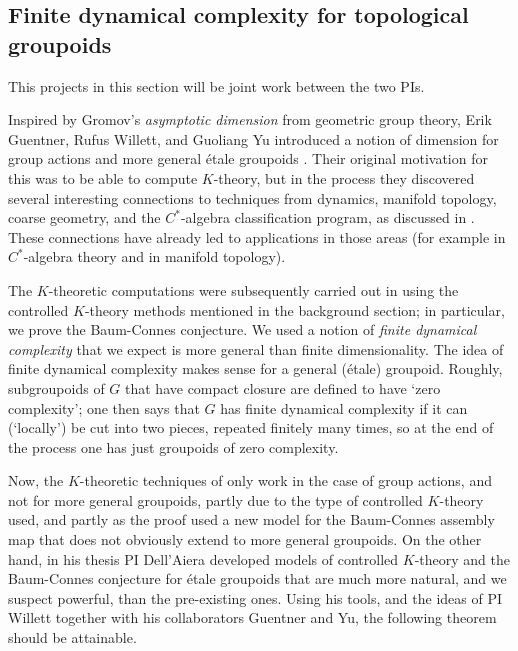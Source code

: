  
 
 
\subsection{Finite dynamical complexity for topological groupoids}

This projects in this section will be joint work between the two PIs.

Inspired by Gromov's \emph{asymptotic dimension} \cite[Section 1.E]{Gromov:1993tr} from geometric group theory, Erik Guentner, Rufus Willett, and Guoliang Yu introduced a notion of dimension for group actions and more general \'{e}tale groupoids \cite{Guentner:2014aa}.  Their original motivation for this was to be able to compute $K$-theory, but in the process they discovered several interesting connections to techniques from dynamics, manifold topology, coarse geometry, and the $C^*$-algebra classification program, as discussed in \cite{Guentner:2014aa}.  These connections have already led to applications in those areas (for example \cite{Deeley:2016aa} in $C^*$-algebra theory and \cite{Bartels:2016aa} in manifold topology).  

The $K$-theoretic computations were subsequently carried out in \cite{Guentner:2014bh} using the controlled $K$-theory methods mentioned in the background section; in particular, we prove the Baum-Connes conjecture.  We used a notion of \emph{finite dynamical complexity} that we expect is more general than finite dimensionality.  The idea of finite dynamical complexity makes sense for a general (\'{e}tale) groupoid.  Roughly, subgroupoids of $G$ that have compact closure are defined to have `zero complexity'; one then says that $G$ has finite dynamical complexity if it can (`locally') be cut into two pieces, repeated finitely many times, so at the end of the process one has just groupoids of zero complexity.

Now, the $K$-theoretic techniques of \cite{Guentner:2014bh} only work in the case of group actions, and not for more general groupoids, partly due to the type of controlled $K$-theory used, and partly as the proof used a new model for the Baum-Connes assembly map that does not obviously extend to more general groupoids.  On the other hand, in his thesis PI Dell'Aiera developed models of controlled $K$-theory and the Baum-Connes conjecture for \'{e}tale groupoids that are much more natural, and we suspect powerful, than the pre-existing ones.  Using his tools, and the ideas of PI Willett together with his collaborators Guentner and Yu, the following theorem should be attainable.


